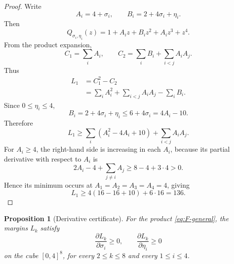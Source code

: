 \documentclass[11pt]{amsart}
\newtheorem{proposition}[theorem]{Proposition}
\begin{document}
\begin{proof}
Write
\[
        A_i=4+\sigma_i,
        \qquad
        B_i=2+4\sigma_i+\eta_i.
\]
Then
\[
        Q_{\sigma_i,\eta_i}(z)=1+A_i z+B_i z^2+A_i z^3+z^4.
\]
From the product expansion,
\[
        C_1=\sum_i A_i,
        \qquad
        C_2=\sum_i B_i+\sum_{i<j}A_iA_j.
\]
Thus
\[
\begin{aligned}
        L_1
        &=C_1^2-C_2  \\
        &=\sum_i A_i^2+\sum_{i<j}A_iA_j-\sum_iB_i.
\end{aligned}
\]
Since \(0\le\eta_i\le4\),
\[
        B_i=2+4\sigma_i+\eta_i\le6+4\sigma_i=4A_i-10.
\]
Therefore
\[
        L_1
        \ge \sum_i(A_i^2-4A_i+10)+\sum_{i<j}A_iA_j.
\]
For \(A_i\ge4\), the right-hand side is increasing in each \(A_i\), because its partial derivative with respect to \(A_i\) is
\[
        2A_i-4+\sum_{j\ne i}A_j\ge 8-4+3\cdot4>0.
\]
Hence its minimum occurs at \(A_1=A_2=A_3=A_4=4\), giving
\[
        L_1\ge 4(16-16+10)+6\cdot16=136.
\]
\end{proof}

\begin{proposition}[Derivative certificate]\label{prop:derivative-certificate}
For the product \eqref{eq:F-general}, the margins \(L_k\) satisfy
\[
        \frac{\partial L_k}{\partial \sigma_i}\ge0,
        \qquad
        \frac{\partial L_k}{\partial \eta_i}\ge0
\]
on the cube \([0,4]^8\), for every \(2\le k\le8\) and every \(1\le i\le4\).
\end{proposition}
\end{document}
